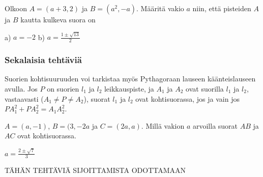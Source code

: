 \begin{tehtavasivu}
\begin {tehtava}
Olkoon $A=(a+3, 2)$ ja $B=(a^2, -a)$. Määritä vakio $a$ niin, että pisteiden $A$ ja $B$ kautta kulkeva suora on
\begin {vastaus}
a) $a=-2$ b) $a=\frac{1\pm\sqrt{13}}{2} $
\end {vastaus}
\end {tehtava}

\subsubsection*{Sekalaisia tehtäviä}

\begin{tehtava}
Suorien kohtisuuruuden voi tarkistaa myös Pythagoraan lauseen käänteislauseen avulla. Jos $P$ on suorien $l_1$ ja $l_2$ leikkauspiste, ja $A_1$ ja $A_2$ ovat suorilla $l_1$ ja $l_2$, vastaavasti ($A_1 \neq P \neq A_2$), suorat $l_1$ ja $l_2$ ovat kohtisuorassa, jos ja vain jos $PA_1^2+PA_2^2 = A_1A_2^2$.
\begin{vastaus}
\end{vastaus}
\end{tehtava}

\begin{tehtava}
$A = (a,-1)$, $B = (3,-2a$ ja $C = (2a,a)$. Millä vakion $a$ arvoilla suorat $AB$ ja $AC$ ovat kohtisuorassa.
\begin{vastaus}
$a = \frac{2\pm \sqrt{7}}{3}$
\end{vastaus}
\end{tehtava}

TÄHÄN TEHTÄVIÄ SIJOITTAMISTA ODOTTAMAAN

\end{tehtavasivu}
